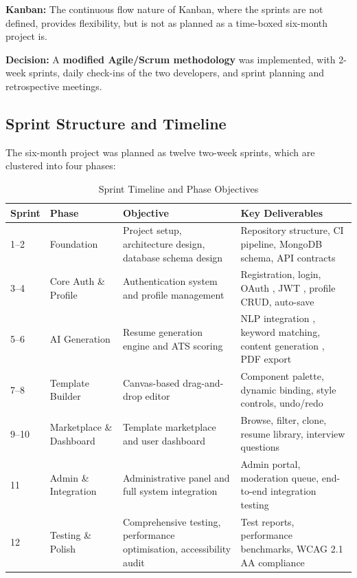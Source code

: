 \documentclass[12pt, a4paper, oneside]{report}
\begin{document}
\textbf{Kanban:} The continuous flow nature of Kanban, where the sprints are not defined, provides flexibility, but is not as planned as a time-boxed six-month project is.

\textbf{Decision:} A \textbf{modified Agile/Scrum methodology} \cite{scrum2020} was implemented, with 2-week sprints, daily check-ins of the two developers, and sprint planning and retrospective meetings.

\subsection{Sprint Structure and Timeline}

The six-month project was planned as twelve two-week sprints, which are clustered into four phases:

\begin{table}[H]
\centering
\caption{Sprint Timeline and Phase Objectives}
\label{tab:sprint_timeline}
\renewcommand{\arraystretch}{1.5}
\begin{tabularx}{\textwidth}{|p{1.5cm}|p{2cm}|X|X|}
\hline
\textbf{Sprint} & \textbf{Phase} & \textbf{Objective} & \textbf{Key Deliverables} \\
\hline
1--2 & Foundation & Project setup, architecture design, database schema design & Repository structure, CI pipeline, MongoDB schema, API contracts \\
\hline
3--4 & Core Auth \& Profile & Authentication system and profile management & Registration, login, OAuth \cite{oauth2012}, JWT \cite{jwt2015}, profile CRUD, auto-save \\
\hline
5--6 & AI Generation & Resume generation engine and ATS scoring & NLP integration \cite{vaswani2017}, keyword matching, content generation \cite{gemini2023}, PDF export \cite{puppeteer2024} \\
\hline
7--8 & Template Builder & Canvas-based drag-and-drop editor & Component palette, dynamic binding, style controls, undo/redo \\
\hline
9--10 & Marketplace \& Dashboard & Template marketplace and user dashboard & Browse, filter, clone, resume library, interview questions \\
\hline
11 & Admin \& Integration & Administrative panel and full system integration & Admin portal, moderation queue, end-to-end integration testing \\
\hline
12 & Testing \& Polish & Comprehensive testing, performance optimisation, accessibility audit & Test reports, performance benchmarks, WCAG 2.1 AA compliance \cite{wcag21} \\
\hline
\end{tabularx}
\end{table}
\end{document}
